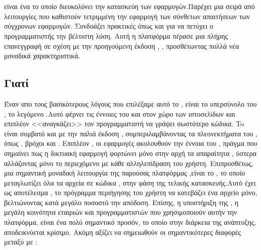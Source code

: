 \section{}
\quad {} είναι ένα  το οποίο διευκολύνει την κατασκεύη των  εφαρμογών.Παρέχει μια σειρά από λειτουργίες που καθιστούν τετριμμένη την εφαρμογή των σύνθετων απαιτήσεων των σύγχρονων εφαρμογών. Συνδυάζει πρακτικές όπως  και  για να πετύχει ο προγραμματιστής την βέλτιστη λύση.\newline
Αυτή η πλατφόρμα πέρασε μια πλήρης επανεγγραφή σε σχέση με την προηγούμενη έκδοση , , προσθέτωντας πολλά νέα μοναδικά χαρακτηριστικά. 


\subsection*{Γιατί}
\quad Έναν απο τους βασικότερους λόγους που επιλέξαμε αυτό το  , είναι το υπερσύνολο του , το λεγόμενο .Αυτό φέρνει τις έννοιες του   και  στον χώρο των ιστοσελίδων και επιπλέον <<αναγκάζει>> τον προγραμματιστή να γράψει σωστότερο κώδικα.
To  είναι συμβατό και με την παλιά έκδοση  , συμπεριλαμβάνοντας τα πλεονεκτήματα του , όπως , βρόχοι  και .\newline
Επιπλέον , οι εφαρμογές  ακολουθούν την έννοια του , πράγμα που σημαίνει πως η δικτυακή εφαρμογή φορτώνει μόνο στην αρχή τα απαραίτητα , ύστερα αλλάζοντας μόνο το περιεχόμενο με κάθε αλληλεπίδραση του χρήστη.\newline
Επιπροσθέτως, μια σημαντική μοναδική λειτουργία της παρούσας πλατφόρμας ,είναι το , το οποίο μεταγλωτίζει όλα τα αρχεία σε κώδικα  , στην φάση της τελικής κατασκευής.Αυτό έχει ως αποτέλεσμα ,  το πρόγραμμα περιήγησης του χρήστη να κατεβάζει ένα αρχείο μόνο, βελτιώνοντας κατά μεγάλο ποσοστό την απόδοση.\newline
Επίσης, η υποστήριξη της , η μεγάλη κοινότητα εταιριών και προγραμματιστών που χρησιμοποιούν αυτήν την πλατφόρμα, είναι ένα πολύ σημαντικό προσόν, το οποίο στην διάρκεια της ανάπτυξης, αποδεικνύεται κρίσιμο.\newline
Ακόμη αξίζει να σημειωθούν οι σημαντικότερες διαφορές μεταξύ  με :
